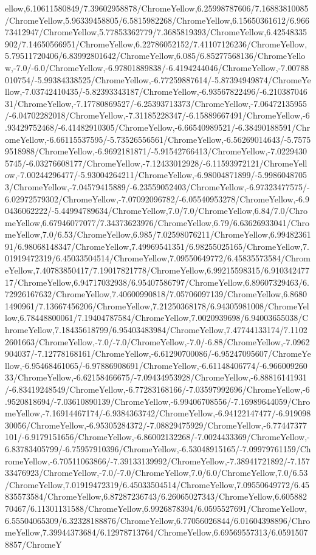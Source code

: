 {\begin{tikzternal}
ellow,6.10611580849/7.39602958878/ChromeYellow,6.25998787606/7.16883810085/ChromeYellow,5.96339458805/6.5815982268/ChromeYellow,6.15650361612/6.96673412947/ChromeYellow,5.77853362779/7.3685819393/ChromeYellow,6.42548335902/7.14650566951/ChromeYellow,6.22786052152/7.41107126236/ChromeYellow,5.79511720406/6.83992801642/ChromeYellow,6.085/6.85277568136/ChromeYellow,-7.0/-6.0/ChromeYellow,-6.97801889838/-6.4194244046/ChromeYellow,-7.00788010754/-5.99384338525/ChromeYellow,-6.77259887614/-5.87394949874/ChromeYellow,-7.03742410435/-5.82393343187/ChromeYellow,-6.93567822496/-6.21038704631/ChromeYellow,-7.17780869527/-6.25393713373/ChromeYellow,-7.06472135955/-6.04702282018/ChromeYellow,-7.31185228347/-6.15889667491/ChromeYellow,-6.93429752468/-6.41482910305/ChromeYellow,-6.66540989521/-6.38490188591/ChromeYellow,-6.66115537595/-5.73526556561/ChromeYellow,-6.56269014643/-5.75759518988/ChromeYellow,-6.9692181871/-5.91542766413/ChromeYellow,-7.02294305745/-6.03276608177/ChromeYellow,-7.12433012928/-6.11593972121/ChromeYellow,-7.00244296477/-5.93004264211/ChromeYellow,-6.98004871899/-5.99860487053/ChromeYellow,-7.04579415889/-6.23559052403/ChromeYellow,-6.97323477575/-6.02972579302/ChromeYellow,-7.07092096782/-6.05540953278/ChromeYellow,-6.90436062222/-5.44994789634/ChromeYellow,7.0/7.0/ChromeYellow,6.84/7.0/ChromeYellow,6.67946077077/7.34373623976/ChromeYellow,6.79/6.63626933041/ChromeYellow,7.0/6.53/ChromeYellow,6.985/7.02598076211/ChromeYellow,6.9948236191/6.98068148347/ChromeYellow,7.49969541351/6.98255025165/ChromeYellow,7.01919472319/6.45033504514/ChromeYellow,7.09550649772/6.45835573584/ChromeYellow,7.40783850417/7.19017821778/ChromeYellow,6.99215598315/6.91034247717/ChromeYellow,6.94717032938/6.95407586797/ChromeYellow,6.89607329463/6.72926167632/ChromeYellow,7.40600990818/7.05706097139/ChromeYellow,6.86801490961/7.13667456206/ChromeYellow,7.21250368178/6.94305981008/ChromeYellow,6.78448800061/7.19404787584/ChromeYellow,7.0020939698/6.94003655038/ChromeYellow,7.18435618799/6.95403483984/ChromeYellow,7.47744133174/7.11022601663/ChromeYellow,-7.0/-7.0/ChromeYellow,-7.0/-6.88/ChromeYellow,-7.0962904037/-7.12778168161/ChromeYellow,-6.61290700086/-6.95247095607/ChromeYellow,-6.95468461065/-6.97886908691/ChromeYellow,-6.61148406774/-6.96600926033/ChromeYellow,-6.62158466675/-7.09434953928/ChromeYellow,-6.88816141931/-6.83419248549/ChromeYellow,-6.77283168166/-7.03597992696/ChromeYellow,-6.9520818694/-7.03610890139/ChromeYellow,-6.99406708556/-7.16989644059/ChromeYellow,-7.16914467174/-6.9384363742/ChromeYellow,-6.94122147477/-6.91909830056/ChromeYellow,-6.95305284372/-7.08829475929/ChromeYellow,-6.77447377101/-6.9179151656/ChromeYellow,-6.86002132268/-7.0024433369/ChromeYellow,-6.83783405799/-6.75957910396/ChromeYellow,-6.53048915165/-7.09979761159/ChromeYellow,-6.70511063866/-7.39133139992/ChromeYellow,-7.38941721892/-7.15733476923/ChromeYellow,-7.0/-7.0/ChromeYellow,7.0/6.0/ChromeYellow,7.0/6.53/ChromeYellow,7.01919472319/6.45033504514/ChromeYellow,7.09550649772/6.45835573584/ChromeYellow,6.87287236743/6.26065027343/ChromeYellow,6.60588270467/6.11301131588/ChromeYellow,6.9926878394/6.0595527691/ChromeYellow,6.55504065309/6.32328188876/ChromeYellow,6.77056026844/6.01604398896/ChromeYellow,7.39944373684/6.12978713764/ChromeYellow,6.69569557313/6.05915078857/ChromeY
\end{tikzternal}}
